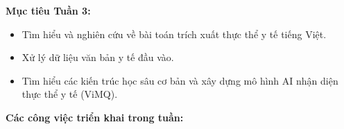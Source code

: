 \vspace{0.5em}\noindent\textbf{Mục tiêu Tuần 3:}

\begin{itemize}
\tightlist
\item
  Tìm hiểu và nghiên cứu về bài toán trích xuất thực thể y tế tiếng
  Việt.
\item
  Xử lý dữ liệu văn bản y tế đầu vào.
\item
  Tìm hiểu các kiến trúc học sâu cơ bản và xây dựng mô hình AI nhận diện
  thực thể y tế (ViMQ).
\end{itemize}

\vspace{0.5em}\noindent\textbf{Các công việc triển khai trong tuần:}

\begingroup
\small
\setlength{\tabcolsep}{3pt}
\renewcommand{\arraystretch}{1.15}
